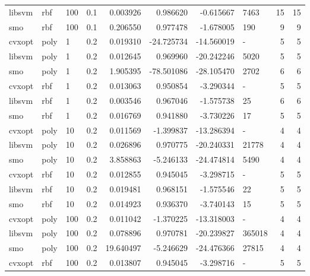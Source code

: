 \begin{tabular}{llllrrrlrr}
libsvm &    rbf & 100 &     0.1 &    0.003926 &   0.986620 &  -0.615667 &     7463 &          15 &        15 \\
   smo &    rbf & 100 &     0.1 &    0.206550 &   0.977478 &  -1.678005 &      190 &           9 &         9 \\
cvxopt &   poly &   1 &     0.2 &    0.019310 & -24.725734 & -14.560019 &        - &           5 &         5 \\
libsvm &   poly &   1 &     0.2 &    0.012645 &   0.969960 & -20.242246 &     5020 &           5 &         5 \\
   smo &   poly &   1 &     0.2 &    1.905395 & -78.501086 & -28.105470 &     2702 &           6 &         6 \\
cvxopt &    rbf &   1 &     0.2 &    0.013063 &   0.950854 &  -3.290344 &        - &           5 &         5 \\
libsvm &    rbf &   1 &     0.2 &    0.003546 &   0.967046 &  -1.575738 &       25 &           6 &         6 \\
   smo &    rbf &   1 &     0.2 &    0.016769 &   0.941880 &  -3.730226 &       17 &           5 &         5 \\
cvxopt &   poly &  10 &     0.2 &    0.011569 &  -1.399837 & -13.286394 &        - &           4 &         4 \\
libsvm &   poly &  10 &     0.2 &    0.026896 &   0.970775 & -20.240331 &    21778 &           4 &         4 \\
   smo &   poly &  10 &     0.2 &    3.858863 &  -5.246133 & -24.474814 &     5490 &           4 &         4 \\
cvxopt &    rbf &  10 &     0.2 &    0.012855 &   0.945045 &  -3.298715 &        - &           5 &         5 \\
libsvm &    rbf &  10 &     0.2 &    0.019481 &   0.968151 &  -1.575546 &       22 &           5 &         5 \\
   smo &    rbf &  10 &     0.2 &    0.014923 &   0.936370 &  -3.740143 &       15 &           5 &         5 \\
cvxopt &   poly & 100 &     0.2 &    0.011042 &  -1.370225 & -13.318003 &        - &           4 &         4 \\
libsvm &   poly & 100 &     0.2 &    0.078896 &   0.970781 & -20.239827 &   365018 &           4 &         4 \\
   smo &   poly & 100 &     0.2 &   19.640497 &  -5.246629 & -24.476366 &    27815 &           4 &         4 \\
cvxopt &    rbf & 100 &     0.2 &    0.013807 &   0.945045 &  -3.298716 &        - &           5 &         5 \\

\end{tabular}

